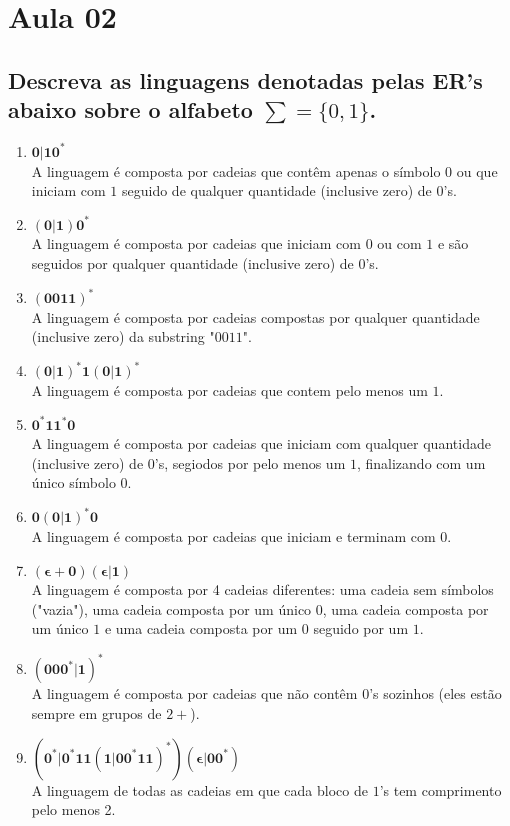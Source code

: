 \section*{Aula 02 }
    \subsection{Descreva as linguagens denotadas pelas ER’s abaixo sobre o alfabeto $\sum = \{0,1\}$.}
    \begin{enumerate}[label=\textbf{\alph* -}]
        \item $\mathbf{0|10^*}$
            \\ A linguagem é composta por cadeias que contêm apenas o símbolo $0$ ou que iniciam com $1$ seguido de qualquer quantidade (inclusive zero) de $0$'s.
        \item $\mathbf{(0|1)0^*}$
            \\ A linguagem é composta por cadeias que iniciam com $0$ ou com $1$ e são seguidos por qualquer quantidade (inclusive zero) de $0$'s.
        \item $\mathbf{(0011)^*}$
            \\ A linguagem é composta por cadeias compostas por qualquer quan\-tidade (inclusive zero) da substring "$0011$".
        \item $\mathbf{(0|1)^*1(0|1)^*}$
            \\ A linguagem é composta por cadeias que contem pelo menos um $1$.
        \item $\mathbf{0^*11^*0}$
            \\ A linguagem é composta por cadeias que iniciam com qualquer quan\-tidade (inclusive zero) de $0$'s, segiodos por pelo menos um $1$, finalizando com um único símbolo $0$.
        \item $\mathbf{0(0|1)^*0}$
            \\ A linguagem é composta por cadeias que iniciam e  terminam com $0$.
        \item $\mathbf{(\epsilon+0)(\epsilon|1)}$
            \\ A linguagem é composta por 4 cadeias diferentes: uma cadeia sem símbolos ("vazia"), uma cadeia composta por um único $0$, uma cadeia composta por um único $1$ e uma cadeia composta por um $0$ seguido por um $1$.
        \item $\mathbf{(000^*|1)^*}$
            \\ A linguagem é composta por cadeias que não contêm $0$'s sozinhos (eles estão sempre em grupos de $2+$).
        \item $\mathbf{(0^*|0^*11(1|00^*11)^*)(\epsilon|00^*)}$
            \\ A linguagem de todas as cadeias em que cada bloco de $1$’s tem comprimento pelo menos 2.
    \end{enumerate}

